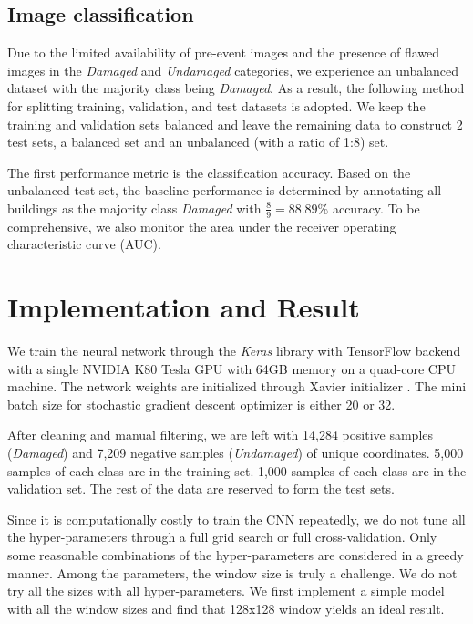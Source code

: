 \documentclass[journal, 12pt, onecolumn,draftclsnofoot]{IEEEtran}
\begin{document}
\subsection{Image classification}\label{sec:classification}
Due to the limited availability of pre-event images and the presence of flawed images in the \textit{Damaged} and \textit{Undamaged} categories, we experience an unbalanced dataset with the majority class being \textit{Damaged}. As a result, the following method for splitting training, validation, and test datasets is adopted. We keep the training and validation sets balanced and leave the remaining data to construct 2 test sets, a balanced set and an unbalanced (with a ratio of 1:8) set. 

The first performance metric is the classification accuracy. Based on the unbalanced test set, the baseline performance is determined by annotating all buildings as the majority class \textit{Damaged} with $\frac{8}{9}=88.89\%$ accuracy. To be comprehensive, we also monitor the area under the receiver operating characteristic curve (AUC).









\section{Implementation and Result}\label{sec:case_study}
We train the neural network through the \textit{Keras} library with TensorFlow backend with a single NVIDIA K80 Tesla GPU with 64GB memory on a quad-core CPU machine. The network weights are initialized through Xavier initializer \cite{xavier}. The mini batch size for stochastic gradient descent optimizer is either 20 or 32.

After cleaning and manual filtering, we are left with 14,284 positive samples (\textit{Damaged}) and 7,209 negative samples (\textit{Undamaged}) of unique coordinates. 5,000 samples of each class are in the training set. 1,000 samples of each class are in the validation set. The rest of the data are reserved to form the test sets. 

Since it is computationally costly to train the CNN repeatedly, we do not tune all the hyper-parameters through a full grid search or full cross-validation. Only some reasonable combinations of the hyper-parameters are considered in a greedy manner. Among the parameters, the window size is truly a challenge. We do not try all the sizes with all hyper-parameters. We first implement a simple model with all the window sizes and find that 128x128 window yields an ideal result. 
\end{document}
